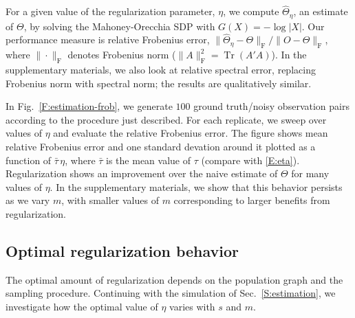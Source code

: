 \documentclass[12pt]{article}
\DeclareMathOperator*{\Tr}{Tr}
\theoremstyle{plain}
\begin{document}
For a given value of the regularization parameter, $\eta$, we compute
$\hat \Theta_\eta$, an estimate of $\Theta$, by solving the
Mahoney-Orecchia SDP with $G(X) = -\log|X|$.  Our performance measure
is relative Frobenius error, $\| \hat \Theta_\eta - \Theta \|_\mathrm{F} / \| O - \Theta
\|_\mathrm{F}$, where $\| \cdot \|_\mathrm{F}$ denotes Frobenius norm
($\|A\|_\mathrm{F}^2 = \Tr(A' A)$).  In the supplementary materials,
we also look at relative spectral error, replacing Frobenius norm with
spectral norm; the results are qualitatively similar.


In Fig.~\ref{F:estimation-frob}, we generate $100$ ground truth/noisy
observation pairs according to the procedure just described.  For each
replicate, we sweep over values of $\eta$ and evaluate the relative
Frobenius error.  The figure shows mean relative Frobenius error and
one standard devation around it plotted as a function of
$\bar \tau \, \eta$, where $\bar \tau$ is the mean value of $\tau$
(compare with \eqref{E:eta}).  Regularization shows an improvement
over the naive estimate of $\Theta$ for many values of $\eta$.  In the
supplementary materials, we show that this behavior persists as we
vary $m$, with smaller values of $m$ corresponding to larger benefits
from regularization.



\subsection{Optimal regularization behavior}

The optimal amount of regularization depends on the population graph
and the sampling procedure.  Continuing with the simulation of
Sec.~\ref{S:estimation}, we investigate how the optimal value of
$\eta$ varies with $s$ and $m$.
\end{document}
